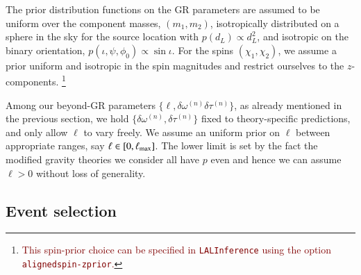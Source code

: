 \documentclass[twocolumn,
               prd,
               aps,
               superscriptaddress,
               tightenlines,
               nofootinbib,
               eqsecnum,
               amsfonts,
               amsmath,
               longbibliography]{revtex4-1}
\newcommand{\ag}[1]{{\textcolor{Maroon}{{#1}} }}
\begin{document}
The prior distribution functions on the GR parameters are assumed to be 
uniform over the component masses, $(m_1, m_2)$, isotropically distributed on a 
sphere in the sky for the source location with $p(d_L) \propto d_L^2$, and isotropic 
on the binary orientation, $p(\iota, \psi, \phi_0) \propto \sin\iota$. For the spins 
$(\chi_1, \chi_2)$, we assume a prior uniform and isotropic in the spin magnitudes and restrict ourselves to the $z$-components.
\footnote{\ag{This spin-prior choice can be specified in \texttt{LALInference} using the option \texttt{alignedspin-zprior}.}}
%

Among our beyond-GR parameters $\{\ell, \delta \omega^{(n)}\delta \tau^{(n)}\}$,
as already mentioned in the previous section, we hold $\{\delta \omega^{(n)},\delta \tau^{(n)}\}$ 
fixed to theory-specific predictions, and only allow $\ell$ to vary freely.
%
We assume an uniform prior on $\ell$ between appropriate ranges,
say $\ell \in [0, \ell_{\rm max}]$.
%
The lower limit is set by the fact the modified gravity theories we consider
all have $p$ even and hence we can assume $\ell > 0$ without loss of
generality.
%


\subsection{Event selection}
\end{document}
